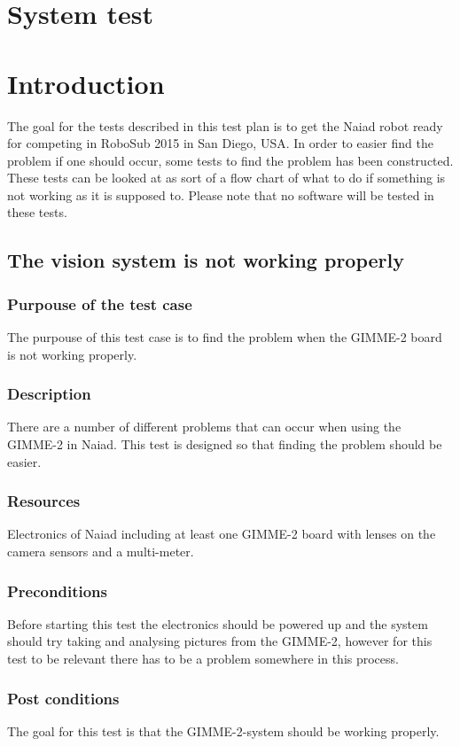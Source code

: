 \section{System test}
\section*{Introduction}
\noindent
The goal for the tests described in this test plan is to get the Naiad robot ready for competing in RoboSub 2015 in San Diego, USA. In order to easier find the problem if one should occur, some tests to find the problem has been constructed. 
These tests can be looked at as sort of a flow chart of what to do if something is not working as it is supposed to. Please note that no software will be tested in these tests. 

\subsection{The vision system is not working properly}
\subsubsection*{Purpouse of the test case}
The purpouse of this test case is to find the problem when the GIMME-2 board is not working properly. 
\subsubsection*{Description}
There are a number of different problems that can occur when using the GIMME-2 in Naiad. This test is designed so that finding the problem should be easier.
\subsubsection*{Resources}
Electronics of Naiad including at least one GIMME-2 board with lenses on the camera sensors and a multi-meter. 
\subsubsection*{Preconditions}
Before starting this test the electronics should be powered up and the system should try taking and analysing pictures from the GIMME-2, however for this test to be relevant there has to be a problem somewhere in this process. 
\subsubsection*{Post conditions}
The goal for this test is that the GIMME-2-system should be working properly. 
